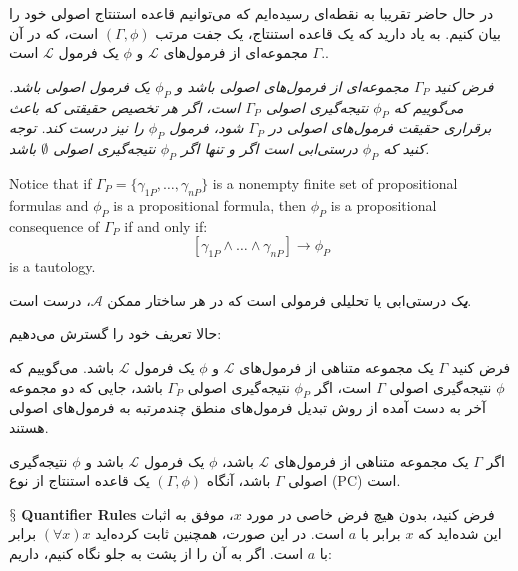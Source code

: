 \documentclass[10pt,a4paper]{article}
\newenvironment{callout}
	{\begin{calloutbox}\color{charcoal}\textbf\textit}
	{\end{calloutbox}}
\newcommand{\newpoint}[1]{\indent$\mathsection$ \textbf{#1}}
\newcommand{\curveL}{\mathcal{L}}
\newcommand{\curveA}{\mathcal{A}}
\begin{document}
                            در حال حاضر تقریبا به نقطه‌ای رسیده‌ایم که می‌توانیم قاعده استنتاج اصولی خود را بیان کنیم. به یاد دارید که یک قاعده استنتاج، یک جفت مرتب $(\Gamma,\phi)$ است، که در آن $\Gamma$ مجموعه‌ای از فرمول‌های $\curveL$ و $\phi$ یک فرمول $\curveL$ است..
                            \begin{define}
                                \textit{فرض کنید $\Gamma_P$ مجموعه‌ای از فرمول‌های اصولی باشد و $\phi_P$ یک فرمول اصولی باشد. می‌گوییم که $\phi_P$ نتیجه‌گیری اصولی $\Gamma_P$ است، اگر هر تخصیص حقیقتی که باعث برقراری حقیقت فرمول‌های اصولی در $\Gamma_P$ شود، فرمول $\phi_P$ را نیز درست کند. توجه کنید که $\phi_P$ درستی‌ابی است اگر و تنها اگر $\phi_P$ نتیجه‌گیری اصولی $\emptyset$ باشد.}
                            \end{define}
                            Notice that if $\Gamma_P=\{\gamma_{1P},\dots,\gamma_{nP}\}$ is a nonempty finite set of propositional formulas and $\phi_P$ is a propositional formula, then $\phi_P$ is a propositional consequence of $\Gamma_P$ if and only if:
                            \begin{equation}
                                \left[
                                    \gamma_{1P}\land\dots\land \gamma_{nP} 
                                \right]\rightarrow \phi_P 
                            \end{equation}
                            is a tautology.
                            \begin{callout}
یک درستی‌ابی یا تحلیلی فرمولی است که در هر ساختار ممکن $\curveA$، درست است.
                            \end{callout}
                            حالا تعریف خود را گسترش می‌دهیم:
                            \begin{define}
                                فرض کنید $\Gamma$ یک مجموعه متناهی از فرمول‌های $\curveL$ و $\phi$ یک فرمول $\curveL$ باشد. می‌گوییم که $\phi$ نتیجه‌گیری اصولی $\Gamma$ است، اگر $\phi_P$ نتیجه‌گیری اصولی $\Gamma_P$ باشد، جایی که دو مجموعه آخر به دست آمده از روش تبدیل فرمول‌های منطق چندمرتبه به فرمول‌های اصولی هستند.
                            \end{define}
                            \begin{define}
                                اگر $\Gamma$ یک مجموعه متناهی از فرمول‌های $\curveL$ باشد، $\phi$ یک فرمول $\curveL$ باشد و $\phi$ نتیجه‌گیری اصولی $\Gamma$ باشد، آنگاه $(\Gamma,\phi)$ یک قاعده استنتاج از نوع (PC) است.
                            \end{define}
                            \newpoint{Quantifier Rules} فرض کنید، بدون هیچ فرض خاصی در مورد $x$، موفق به اثبات این شده‌اید که $x$ برابر با $a$ است. در این صورت، همچنین ثابت کرده‌اید $(\forall x)x$ برابر با $a$ است. اگر به آن را از پشت به جلو نگاه کنیم، داریم:
\end{document}
